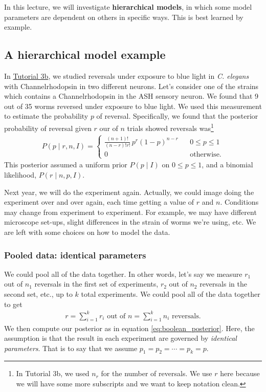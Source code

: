 In this lecture, we will investigate \textbf{hierarchical models}, in
which some model parameters are dependent on others in specific ways.
This is best learned by example.

\subsection{A hierarchical model example}
In
\href{http://bebi103.caltech.edu/2015/tutorials/t3b_boolean_data.html}{Tutorial
  3b}, we studied reversals under exposure to blue light in
\textit{C. elegans} with Channelrhodopsin in two different neurons.
Let's consider one of the strains which contains a Channelrhodopsin in
the ASH sensory neuron.  We found that 9 out of 35 worms reversed
under exposure to blue light.  We used this measurement to estimate
the probability $p$ of reversal.  Specifically, we found that the
posterior probability of reversal given $r$ our of $n$ trials showed
reversals was\footnote{In Tutorial 3b, we used $n_r$ for the number of
  reversals.  We use $r$ here because we will have some more
  subscripts and we want to keep notation clean.}
\begin{align}
P(p\mid r, n, I) = \left\{\begin{array}{ccl}
\displaystyle{\frac{(n+1)!}{(n-r)!r!}\,p^{r}(1-p)^{n-r}} && 0\le p \le 1 \\[1em]
0 & & \text{otherwise}.
\end{array}
\right.
\label{eq:boolean_posterior}
\end{align}
This posterior assumed a uniform prior $P(p\mid I)$ on $0\le p \le 1$,
and a binomial likelihood, $P(r\mid n, p , I)$.

Next year, we will do the experiment again.  Actually, we could image
doing the experiment over and over again, each time getting a value of
$r$ and $n$.  Conditions may change from experiment to experiment.
For example, we may have different microscope set-ups, slight
differences in the strain of worms we're using, etc.  We are left with
some choices on how to model the data.


\subsubsection{Pooled data: identical parameters}
We could pool all of the data together.  In other words, let's say we
measure $r_1$ out of $n_1$ reversals in the first set of experiments,
$r_2$ out of $n_2$ reversals in the second set, etc., up to $k$ total
experiments.  We could pool all of the data together to get
\begin{align}
r = \sum_{i=1}^k r_i \text{ out of } n = \sum_{i=1}^k n_i \text{ reversals}.
\end{align}
We then compute our posterior as in equation
\eqref{eq:boolean_posterior}.  Here, the assumption is that the result
in each experiment are governed by \textit{identical parameters}.
That is to say that we assume $p_1 = p_2 = \cdots = p_k = p$.

